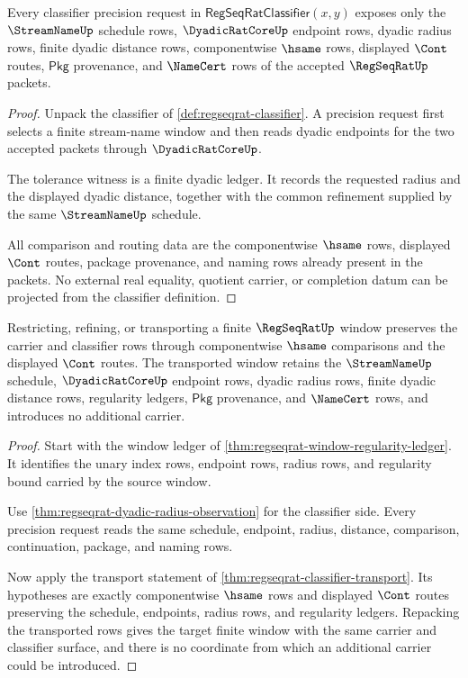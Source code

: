 \begin{theorem}
\label{thm:regseqrat-dyadic-radius-observation}
Every classifier precision request in $\mathsf{RegSeqRatClassifier}(x,y)$ exposes only the $\StreamNameUp$ schedule rows, $\DyadicRatCoreUp$ endpoint rows, dyadic radius rows, finite dyadic distance rows, componentwise $\hsame$ rows, displayed $\Cont$ routes, $\mathsf{Pkg}$ provenance, and $\NameCert$ rows of the accepted $\RegSeqRatUp$ packets.
\end{theorem}
\begin{proof}
Unpack the classifier of \autoref{def:regseqrat-classifier}. A precision request first selects a finite stream-name window and then reads dyadic endpoints for the two accepted packets through $\DyadicRatCoreUp$.

The tolerance witness is a finite dyadic ledger. It records the requested radius and the displayed dyadic distance, together with the common refinement supplied by the same $\StreamNameUp$ schedule.

All comparison and routing data are the componentwise $\hsame$ rows, displayed $\Cont$ routes, package provenance, and naming rows already present in the packets. No external real equality, quotient carrier, or completion datum can be projected from the classifier definition.
\end{proof}

\begin{theorem}
\label{thm:regseqrat-finite-window-transport-obligation}
Restricting, refining, or transporting a finite $\RegSeqRatUp$ window preserves the carrier and classifier rows through componentwise $\hsame$ comparisons and the displayed $\Cont$ routes. The transported window retains the $\StreamNameUp$ schedule, $\DyadicRatCoreUp$ endpoint rows, dyadic radius rows, finite dyadic distance rows, regularity ledgers, $\mathsf{Pkg}$ provenance, and $\NameCert$ rows, and introduces no additional carrier.
\end{theorem}
\begin{proof}
Start with the window ledger of \autoref{thm:regseqrat-window-regularity-ledger}. It identifies the unary index rows, endpoint rows, radius rows, and regularity bound carried by the source window.

Use \autoref{thm:regseqrat-dyadic-radius-observation} for the classifier side. Every precision request reads the same schedule, endpoint, radius, distance, comparison, continuation, package, and naming rows.

Now apply the transport statement of \autoref{thm:regseqrat-classifier-transport}. Its hypotheses are exactly componentwise $\hsame$ rows and displayed $\Cont$ routes preserving the schedule, endpoints, radius rows, and regularity ledgers. Repacking the transported rows gives the target finite window with the same carrier and classifier surface, and there is no coordinate from which an additional carrier could be introduced.
\end{proof}

